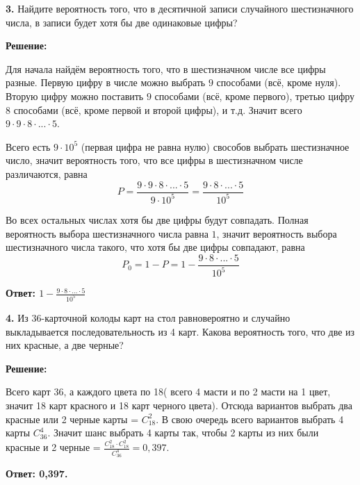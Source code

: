 \documentclass[a4paper,12pt]{article} %
\begin{document}
{\bf 3.} Найдите вероятность того, что в десятичной записи случайного
шестизначного числа, в записи будет хотя бы две одинаковые цифры?
\begin{center}
\bfseries
{\Large Решение: }
\end{center}

Для начала найдём вероятность того, что в шестизначном числе все цифры разные. Первую цифру в числе можно выбрать $9$ способами (всё, кроме нуля). Вторую цифру можно поставить $9$ способами (всё, кроме первого), третью цифру $8$ способами (всё, кроме первой и второй цифры), и т.д. Значит всего $9 \cdot 9 \cdot 8 \cdot ... \cdot 5$.

Всего есть $9 \cdot 10^5$ (первая цифра не равна нулю) свособов выбрать шестизначное число, значит вероятность того, что все цифры в шестизначном числе различаются, равна
\[P = \frac{9 \cdot 9 \cdot 8 \cdot ... \cdot 5}{9 \cdot 10^5} = \frac{9 \cdot 8 \cdot ... \cdot 5}{10^5}\]

Во всех остальных числах хотя бы две цифры будут совпадать. Полная вероятность выбора шестизначного числа равна $1$, значит вероятность выбора шестизначного числа такого, что хотя бы две цифры совпадают, равна
\[P_0 = 1 - P = 1 - \frac{9 \cdot 8 \cdot ... \cdot 5}{10^5}\]


\begin{flushright}
\begin{large}
\textbf {Ответ: $1 - \frac{9 \cdot 8 \cdot ... \cdot 5}{10^5}$}
\end{large}
\end{flushright}

{\bf 4.} Из 36-карточной колоды карт на стол равновероятно и случайно
выкладывается последовательность из 4 карт. Какова вероятность того,
что две из них красные, а две черные?
\begin{center}
\bfseries
{\Large Решение: }
\end{center}

Всего карт 36, а каждого цвета по 18( всего 4 масти и по 2 масти на 1 цвет, значит 18 карт красного и 18 карт черного цвета). Отсюда вариантов выбрать два красные или 2 черные карты = $C^2_{18}$. В свою очередь всего вариантов выбрать 4 карты $C^4_{36}$. Значит шанс выбрать 4 карты так, чтобы 2 карты из них были красные и 2 черные = $\frac{C^2_{18}\cdot C^2_{18}}{C^4_{36}} = 0,397$.

\begin{flushright}
\begin{large}
\textbf {Ответ: 0,397.}
\end{large}
\end{flushright}
\end{document}
